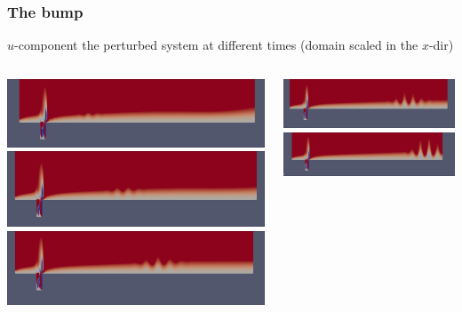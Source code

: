 \documentclass[
  aspectratio=169, %
  t, %
  onlytextwidth, %
  10pt, %
]{beamer}
\begin{document}
\begin{frame}
  \frametitle{The bump}
  $u$-component the perturbed system at different times (domain scaled in the $x$-dir)
   \begin{columns}[T] %
    \begin{column}{0.48\linewidth} %
      {
	\centering
	\includegraphics[width=\linewidth]{Images/1.png}
      }
      {
	\centering
	\includegraphics[width=\linewidth]{Images/2.png}
      }
      {
	\centering
	\includegraphics[width=\linewidth]{Images/3.png}
      }
    \end{column}
    \begin{column}{0.48\linewidth} %
       {
	\centering
	\includegraphics[width=\linewidth]{Images/4.png}
      }
      {
	\centering
	\includegraphics[width=\linewidth]{Images/5.png}
}
\end{column}
\end{columns}
\end{frame}
\end{document}
